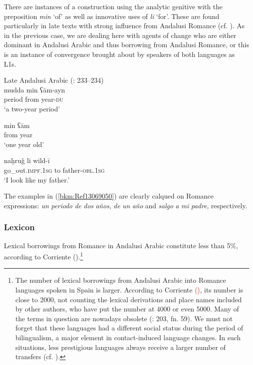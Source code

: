 \documentclass[output=paper,modfonts,nonflat]{langsci/langscibook}
\begin{document}
There are instances of a construction using the analytic genitive with the preposition \textit{min} ‘of’ as well as innovative uses of \textit{li} ‘for’. These are found particularly in late texts with strong influence from Andalusi Romance (cf. \citealt{Corriente2012}). As in the previous case, we are dealing here with agents of change who are either dominant in Andalusi Arabic and thus borrowing from Andalusi Romance, or this is an instance of convergence brought about by speakers of both languages as L1s.


\ea\label{bkm:Ref13069050}
Late Andalusi Arabic (\citealt{CorrientePereiraVicente2015}: 233–234)\\
\ea \gll mudda min ʕām-ayn\\
     period from year-\textsc{du}\\
\glt ‘a two-year period’



\ex\label{ex:key:}
\gll min ʕām\\
     from year\\
\glt ‘one year old’



\ex\label{ex:key:}
\gll naḫruǧ li wild-ī\\
  go\_out.\textsc{impf.1sg} to father-\textsc{obl.1sg}\\
\glt ‘I look like my father.’
\z
\z

The examples in (\ref{bkm:Ref13069050}) are clearly calqued on Romance expressions: \textit{un} \textit{periodo} \textit{de} \textit{dos} \textit{años,} \textit{de} \textit{un} \textit{año} and \textit{salgo} \textit{a} \textit{mi} \textit{padre}, respectively. 
 
\subsubsection{Lexicon}




Lexical borrowings from Romance in Andalusi Arabic constitute less than 5\%, according to Corriente (\citeyear[142]{Corriente1992book}).\footnote{The number of lexical borrowings from Andalusi Arabic into Romance languages spoken in Spain is larger. According to Corriente \textcolor{red}{(\citeyear{Corriente2005})}, its number is close to 2000, not counting the lexical derivations and place names included by other authors, who have put the number at 4000 or even 5000. Many of the terms in question are nowadays obsolete (\citealt{Corriente2005}: 203, fn. 59). We must not forget that these languages had a different social status during the period of bilingualism, a major element in contact-induced language changes. In such situations, less prestigious languages always receive a larger number of transfers (cf.  \citealt{CorrientePereiraVicente2019}).} 
\end{document}
